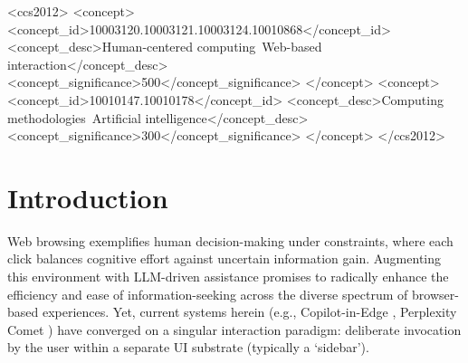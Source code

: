 \documentclass[sigconf]{acmart}
\begin{document}
\begin{CCSXML}
<ccs2012>
   <concept>
       <concept_id>10003120.10003121.10003124.10010868</concept_id>
       <concept_desc>Human-centered computing~Web-based interaction</concept_desc>
       <concept_significance>500</concept_significance>
       </concept>
   <concept>
       <concept_id>10010147.10010178</concept_id>
       <concept_desc>Computing methodologies~Artificial intelligence</concept_desc>
       <concept_significance>300</concept_significance>
       </concept>
 </ccs2012>
\end{CCSXML}





\maketitle

\section{Introduction}

Web browsing exemplifies human decision-making under constraints, where each click balances cognitive effort against uncertain information gain. Augmenting this environment with LLM-driven assistance promises to radically enhance the efficiency and ease of information-seeking across the diverse spectrum of browser-based experiences. Yet, current systems herein (e.g., Copilot-in-Edge \cite{Edge}, Perplexity Comet \cite{Comet}) have converged on a singular interaction paradigm: deliberate invocation by the user within a separate UI substrate (typically a `sidebar'). 
\end{document}
